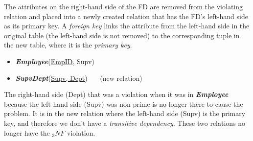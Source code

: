 \documentclass{report}
\begin{document}
The attributes on the right-hand side of the FD are removed from the violating relation and placed into a newly created relation that has the FD's left-hand side as its primary key. A \textit{foreign key} links the attribute from the left-hand side in the original table (the left-hand side is not removed) to the corresponding tuple in the new table, where it is the \textit{primary key}.
\begin{itemize}
    \item \textit{\textbf{Employee}}(\underline{EmpID}, Supv)
    \item \textit{\textbf{SupvDept}}(\underline{Supv, Dept}) \ \ \ (new relation)
\end{itemize}
The right-hand side (Dept) that was a violation when it was in \textit{\textbf{Employee}} because the left-hand side (Supv) was non-prime is no longer there to cause the problem. It is in the new relation where the left-hand side (Supv) is the primary key, and therefore we don't have a \textit{transitive dependency}. These two relations no longer have the $_3NF$ violation.
\end{document}
